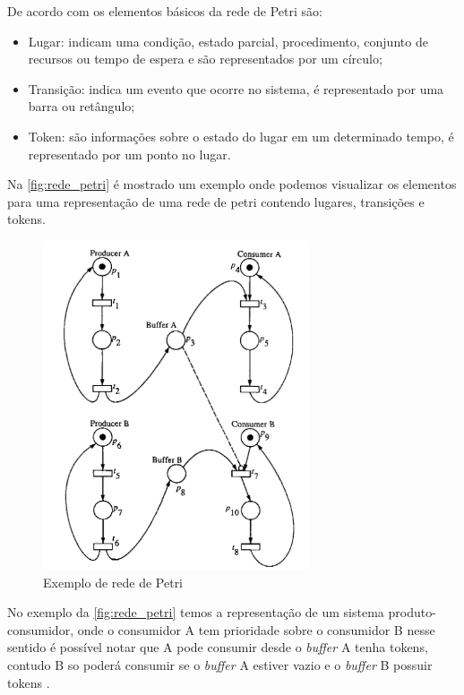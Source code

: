         \par
        De acordo com \citeauthor{cardoso1997redes} os elementos básicos da rede de Petri são:
        \begin{itemize}
            \item Lugar: indicam uma condição, estado parcial, procedimento, conjunto de recursos ou tempo de espera e são representados por um círculo;
            \item Transição: indica um evento que ocorre no sistema, é representado por uma barra ou retângulo;
            \item Token: são informações sobre o estado do lugar em um determinado tempo, é representado por um ponto no lugar.
        \end{itemize} Na \autoref{fig:rede_petri} é mostrado um exemplo onde podemos visualizar os elementos para uma representação de  uma rede de petri contendo lugares, transições e tokens.
        \begin{figure}[H]
              \caption{\label{fig:rede_petri}{Exemplo de rede de Petri}}
              \centering
              \includegraphics[width=0.7\textwidth]{Figuras/exemplo_rede_petri.png}
        \end{figure}
        \par 
        No exemplo da \autoref{fig:rede_petri} temos a representação de um sistema produto-consumidor, onde o consumidor A tem prioridade sobre o consumidor B nesse sentido é possível notar que A pode consumir desde o \textit{buffer} A tenha tokens, contudo B so poderá consumir se o \textit{buffer} A estiver vazio e o \textit{buffer} B possuir tokens \cite{murata}.
